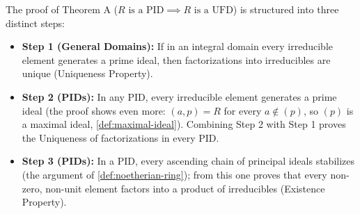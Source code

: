 \begin{content}

\begin{steps}
The proof of Theorem A ($R \text{ is a PID} \implies R \text{ is a UFD}$) is structured into three distinct steps:
\begin{itemize}
    \item \textbf{Step 1 (General Domains):} If in an integral domain every irreducible element generates a prime ideal, then factorizations into irreducibles are unique (Uniqueness Property).
    \item \textbf{Step 2 (PIDs):} In any PID, every irreducible element generates a prime ideal (the proof shows even more: $(a, p) = R$ for every $a \notin (p)$, so $(p)$ is a maximal ideal, \cref{def:maximal-ideal}). Combining Step 2 with Step 1 proves the Uniqueness of factorizations in every PID.
    \item \textbf{Step 3 (PIDs):} In a PID, every ascending chain of principal ideals stabilizes (the argument of \cref{def:noetherian-ring}); from this one proves that every non-zero, non-unit element factors into a product of irreducibles (Existence Property).
\end{itemize}
\end{steps}
\end{content}

